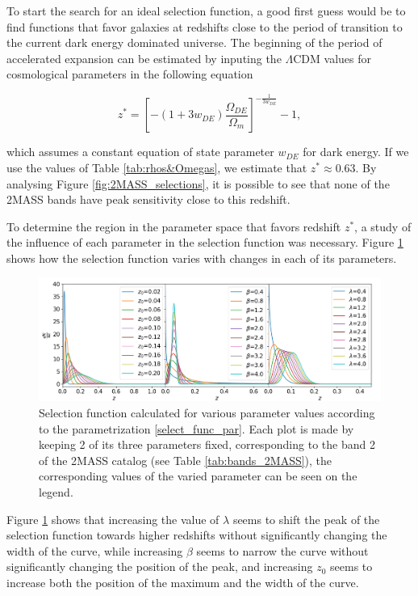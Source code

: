 \documentclass[openany,a4paper,12pt,oneside]{book}
\begin{document}
\begin{spacing}{1.5}
To start the search for an ideal selection function, a good first guess would be to find functions that favor galaxies at redshifts close to the period of transition to the current dark energy dominated universe. The beginning of the period of accelerated expansion can be estimated by inputing the $\Lambda$CDM values for cosmological parameters in the following equation

\begin{equation}\label{dark_energy_era_redshift}
	z^*=\left[-(1+3w_{DE})\frac{\Omega_{DE}}{\Omega_m}\right]^{-\frac{1}{3w_{DE}}}-1,
\end{equation}

\noindent which assumes a constant equation of state parameter $w_{DE}$ for dark energy\cite{dark_energy_era}. If we use the values of Table \ref{tab:rhos&Omegas}, we estimate that $z^*\approx 0.63$. By analysing Figure \ref{fig:2MASS_selections}, it is possible to see that none of the 2MASS bands have peak sensitivity close to this redshift.

To determine the region in the parameter space that favors redshift $z^*$, a study of the influence of each parameter in the selection function was necessary. Figure \ref{fig:selection_tripleplot} shows how the selection function varies with changes in each of its parameters.

\begin{figure}[!htb]
	\centering
	\includegraphics[width=.98\linewidth]{Imagens/Selection_TriplePlot.png}
	\caption{Selection function calculated for various parameter values according to the parametrization \eqref{select_func_par}. Each plot is made by keeping 2 of its three parameters fixed, corresponding to the band 2 of the 2MASS catalog (see Table \ref{tab:bands_2MASS}), the corresponding values of the varied parameter can be seen on the legend.}
	\label{fig:selection_tripleplot}
\end{figure}

Figure \ref{fig:selection_tripleplot} shows that increasing the value of $\lambda$ seems to shift the peak of the selection function towards higher redshifts without significantly changing the width of the curve, while increasing $\beta$ seems to narrow the curve without significantly changing the position of the peak, and increasing $z_0$ seems to increase both the position of the maximum and the width of the curve. 


\end{spacing}
\end{document}
